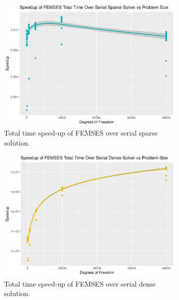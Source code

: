 \begin{figure}
	\centering
	\begin{subfigure}{0.48\linewidth}
		\centering
		\includegraphics[width = \linewidth]{Plots/total_femses_cpu_sparse_speedup_vs_n}
		\caption{Total time speed-up of FEMSES over serial sparse solution.}
		\label{fig:tot_femses_sparse}
	\end{subfigure}\hfill
	\begin{subfigure}{0.48\linewidth}
		\centering
		\includegraphics[width=\linewidth]{Plots/total_femses_cpu_dense_speedup_vs_n}
		\caption{Total time speed-up of FEMSES over serial dense solution.}
		\label{fig:tot_femses_dense}
	\end{subfigure}\\
	\begin{subfigure}{0.48\linewidth}

\end{subfigure}
\end{figure}
